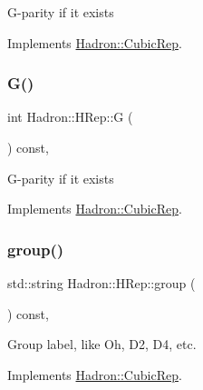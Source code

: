 G-\/parity if it exists 

Implements \mbox{\hyperlink{structHadron_1_1CubicRep_a52104e43266d1614c00bbd1c3b395458}{Hadron\+::\+Cubic\+Rep}}.

\mbox{\label{structHadron_1_1HRep_a131ba3bb47daeaf60d4673a2535a5bb2}} 
\subsubsection{\texorpdfstring{G()}{G()}\hspace{0.1cm}{\footnotesize\ttfamily [2/2]}}
{\footnotesize\ttfamily int Hadron\+::\+H\+Rep\+::G (\begin{DoxyParamCaption}{ }\end{DoxyParamCaption}) const\hspace{0.3cm}{\ttfamily [inline]}, {\ttfamily [virtual]}}

G-\/parity if it exists 

Implements \mbox{\hyperlink{structHadron_1_1CubicRep_a52104e43266d1614c00bbd1c3b395458}{Hadron\+::\+Cubic\+Rep}}.

\mbox{\label{structHadron_1_1HRep_afba35b8c5ac09db6b62284283ef291f6}} 
\subsubsection{\texorpdfstring{group()}{group()}\hspace{0.1cm}{\footnotesize\ttfamily [1/2]}}
{\footnotesize\ttfamily std\+::string Hadron\+::\+H\+Rep\+::group (\begin{DoxyParamCaption}{ }\end{DoxyParamCaption}) const\hspace{0.3cm}{\ttfamily [inline]}, {\ttfamily [virtual]}}

Group label, like Oh, D2, D4, etc. 

Implements \mbox{\hyperlink{structHadron_1_1CubicRep_a0748f11ec87f387062c8e8981339a29c}{Hadron\+::\+Cubic\+Rep}}.

\mbox{\label{structHadron_1_1HRep_afba35b8c5ac09db6b62284283ef291f6}} 
